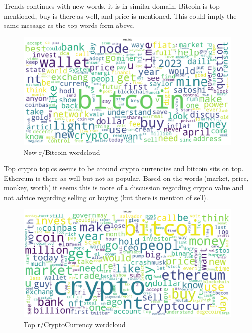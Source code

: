\begin{landscape}
Trends continues with new words, it is in similar domain. Bitcoin is top mentioned, buy is there as well, and price is mentioned. This could imply the same message as the top words form above.

\begin{figure}[H]
\includegraphics[scale=0.55]{img/B1/new_btc_wordcloud.png}
\centering
\caption{New r/Bitcoin wordcloud}
\label{fig:new_btc_wordcloud}
\end{figure}
\end{landscape}

\begin{landscape}
Top crypto topics seems to be around crypto currencies and bitcoin sits on top. Ethereum is there as well but not as popular. Based on the words (market, price, monkey, worth) it seems this is more of a discussion regarding crypto value and not advice regarding selling or buying (but there is mention of sell).

\begin{figure}[H]
\includegraphics[scale=0.55]{img/B1/top_cry_wordcloud.png}
\centering
\caption{Top r/CryptoCurrency wordcloud}
\label{fig:top_cry_wordcloud}
\end{figure}
\end{landscape}

